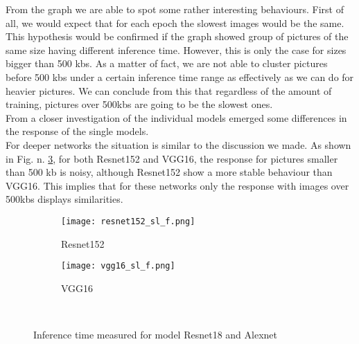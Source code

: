 From the graph we are able to spot some rather interesting behaviours. First of all, we would expect that for each epoch the slowest images would be the same. This hypothesis would be confirmed if the graph showed group of pictures of the same size having different inference time. However, this is only the case for sizes bigger than 500 kbs. As a matter of fact, we are not able to cluster pictures before 500 kbs under a certain inference time range as effectively as we can do for heavier pictures. We can conclude from this that regardless of the amount of training, pictures over 500kbs are going to be the slowest ones. \\
From a closer investigation of the individual models emerged some differences in the response of the single models. \\
For deeper networks the situation is similar to the discussion we made. As shown in Fig. n. \ref{fig:sl_f_deep}, for both Resnet152 and VGG16, the response for pictures smaller than 500 kb is noisy, although Resnet152 show a more stable behaviour than VGG16. This implies that for these networks only the response with images over 500kbs displays similarities.  
\begin{figure}[h]
     \begin{subfigure}{0.5\textwidth}
	    \texttt{[image: resnet152\_sl\_f.png]}
	    \caption{Resnet152}
         \label{fig:resnet152_sl_f}
         
     \end{subfigure}
     \hfill
     \begin{subfigure}{0.5\textwidth}
	    \texttt{[image: vgg16\_sl\_f.png]}
	    \caption{VGG16}
        \label{fig:vgg16_sl_f}
        
     \end{subfigure}\\
     \caption{Inference time measured for model Resnet18 and Alexnet}
        \label{fig:sl_f_deep}
\end{figure}

